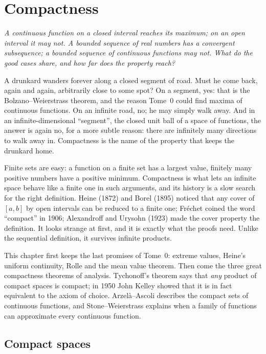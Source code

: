 \chapter{Compactness}

\begin{center}\itshape
A continuous function on a closed interval reaches its maximum; on an open interval it may not. A bounded sequence of
real numbers has a convergent subsequence; a bounded sequence of continuous functions may not. What do the good
cases share, and how far does the property reach?
\end{center}

A drunkard wanders forever along a closed segment of road. Must he come back, again and again, arbitrarily close to some
spot? On a segment, yes: that is the Bolzano--Weierstrass theorem, and the reason Tome~0 could find maxima of continuous
functions. On an infinite road, no; he may simply walk away. And in an infinite-dimensional ``segment'', the closed unit
ball of a space of functions, the answer is again no, for a more subtle reason: there are infinitely many directions to
walk away in. Compactness is the name of the property that keeps the drunkard home.

Finite sets are easy: a function on a finite set has a largest value, finitely many positive numbers have a positive
minimum. Compactness is what lets an infinite space behave like a finite one in such arguments, and its history is a slow
search for the right definition. Heine (1872) and Borel (1895) noticed that any cover of $[a,b]$ by open intervals can be
reduced to a finite one; Fr\'echet coined the word ``compact'' in 1906; Alexandroff and Urysohn (1923) made the cover
property the definition. It looks strange at first, and it is exactly what the proofs need. Unlike the sequential
definition, it survives infinite products.

This chapter first keeps the last promises of Tome~0: extreme values, Heine's uniform continuity, Rolle and the mean value
theorem. Then come the three great compactness theorems of analysis. Tychonoff's theorem says that \emph{any} product of compact
spaces is compact; in 1950 John Kelley showed that it is in fact equivalent to the axiom of choice. Arzel\`a--Ascoli describes the
compact sets of continuous functions, and Stone--Weierstrass explains when a family of functions can approximate every
continuous function.

\section{Compact spaces}

